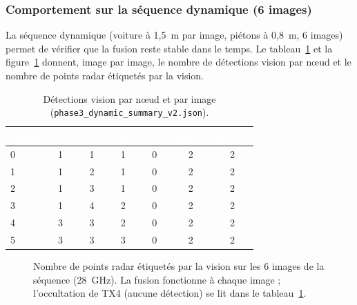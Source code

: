 \documentclass[12pt,a4paper,titlepage]{article}
\newcommand{\hd}[1]{\textcolor{white}{\textbf{#1}}}
\begin{document}
\subsubsection{Comportement sur la séquence dynamique (6 images)}

La séquence dynamique (voiture à 1,5~m par image, piétons à 0,8~m, 6 images) permet de vérifier que la fusion reste stable dans le temps. Le tableau~\ref{tab:res_dynamic} et la figure~\ref{fig:chart_dynamic} donnent, image par image, le nombre de détections vision par n\oe ud et le nombre de points radar étiquetés par la vision.

\begin{table}[H]
    \centering
    \caption{Détections vision par n\oe ud et par image (\texttt{phase3\_dynamic\_summary\_v2.json}).}
    \label{tab:res_dynamic}
    \begin{tabular}{lcccccc}
        \toprule
        \rowcolor{tabhead}
        \hd{Image} & \hd{TX1} & \hd{TX2} & \hd{TX3} & \hd{TX4} & \hd{ped\_a} & \hd{ped\_b} \\
        \midrule
        0 & 1 & 1 & 1 & 0 & 2 & 2 \\
        1 & 1 & 2 & 1 & 0 & 2 & 2 \\
        2 & 1 & 3 & 1 & 0 & 2 & 2 \\
        3 & 1 & 4 & 2 & 0 & 2 & 2 \\
        4 & 3 & 3 & 2 & 0 & 2 & 2 \\
        5 & 3 & 3 & 3 & 0 & 2 & 2 \\
        \bottomrule
    \end{tabular}
\end{table}

\begin{figure}[H]
    \centering
    \caption{Nombre de points radar étiquetés par la vision sur les 6 images de la séquence (28~GHz). La fusion fonctionne à chaque image ; l'occultation de TX4 (aucune détection) se lit dans le tableau~\ref{tab:res_dynamic}.}
    \label{fig:chart_dynamic}
\end{figure}
\end{document}
